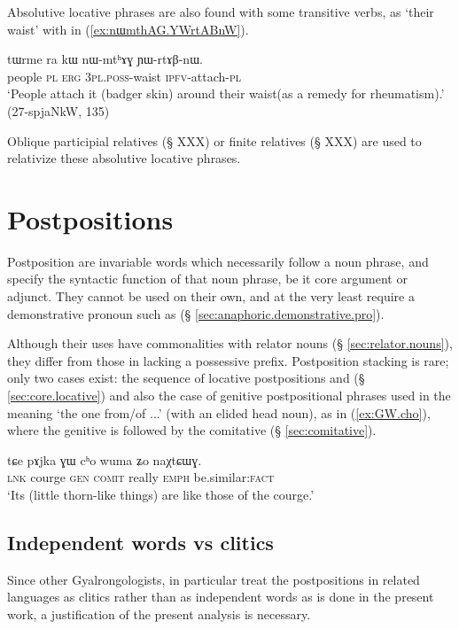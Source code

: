 Absolutive locative phrases are also found with some transitive verbs, as  `their waist' with  in (\ref{ex:nɯmthAG.YWrtABnW}). 

\begin{exe}
\ex \label{ex:nɯmthAG.YWrtABnW}
 \gll tɯrme ra kɯ nɯ-mtʰɤɣ ɲɯ-rtɤβ-nɯ. \\
 people \textsc{pl} \textsc{erg} \textsc{3pl}.\textsc{poss}-waist \textsc{ipfv}-attach-\textsc{pl} \\
 \glt `People attach it (badger skin) around their waist(as a remedy for rheumatism).' (27-spjaNkW, 135)
\end{exe}

Oblique participial relatives (§ XXX) or finite relatives (§ XXX) are used to relativize these absolutive locative phrases.

\section{Postpositions} \label{ex:postpositions}
Postposition are invariable words which necessarily follow a noun phrase, and specify the syntactic function of that noun phrase, be it core argument or adjunct. They cannot be used on their own, and at the very least require a demonstrative pronoun such as  (§ \ref{sec:anaphoric.demonstrative.pro}). 

Although their uses have commonalities with relator nouns (§ \ref{sec:relator.nouns}), they differ from those in lacking a possessive prefix. Postposition stacking is rare; only two cases exist: the sequence of locative postpositions  and  (§ \ref{sec:core.locative}) and also the case of genitive postpositional phrases used in the meaning `the one from/of ...' (with an elided head noun), as in (\ref{ex:GW.cho}), where the genitive  is followed by the comitative (§ \ref{sec:comitative}). 

\begin{exe}
\ex \label{ex:GW.cho}
 \gll tɕe pɤjka ɣɯ cʰo wuma ʑo naχtɕɯɣ. \\
 \textsc{lnk} courge \textsc{gen} \textsc{comit} really \textsc{emph} be.similar:\textsc{fact} \\
 \glt `Its (little thorn-like things) are like those of the courge.' 
 \end{exe}
 
\subsection{Independent words vs clitics}  \label{ex:word.vs.clitic.postp}  
Since other Gyalrongologists, in particular \citet{jackson98morphology, jackson14morpho} treat the postpositions in related languages as clitics rather than as independent words as is done in the present work, a justification of the present analysis is necessary.

